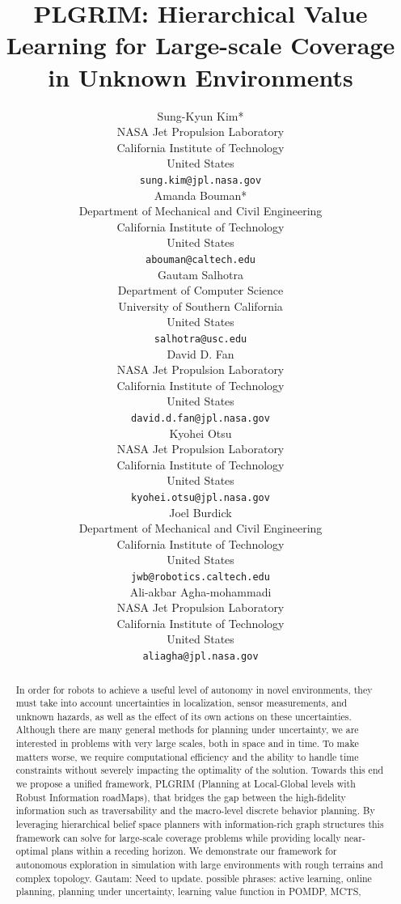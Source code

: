 \documentclass{article}
\title{
PLGRIM: Hierarchical Value Learning for Large-scale Coverage in Unknown Environments
}
\author{
  Sung-Kyun Kim*\\
  NASA Jet Propulsion Laboratory\\
  California Institute of Technology\\
  United States\\
  \texttt{sung.kim@jpl.nasa.gov} \\
  \And
  Amanda Bouman*\\
  Department of Mechanical and Civil Engineering\\
  California Institute of Technology\\
  United States\\
  \texttt{abouman@caltech.edu} \\
  \And
  Gautam Salhotra\\
  Department of Computer Science\\
  University of Southern California\\
  United States\\
  \texttt{salhotra@usc.edu} \\
  \And
  David D. Fan\\
  NASA Jet Propulsion Laboratory\\
  California Institute of Technology\\
  United States\\
  \texttt{david.d.fan@jpl.nasa.gov} \\
  \And
  Kyohei Otsu\\
  NASA Jet Propulsion Laboratory\\
  California Institute of Technology\\
  United States\\
  \texttt{kyohei.otsu@jpl.nasa.gov} \\
  \And
  Joel Burdick\\
  Department of Mechanical and Civil Engineering\\
  California Institute of Technology\\
  United States\\
  \texttt{jwb@robotics.caltech.edu} \\
  \And
  Ali-akbar Agha-mohammadi\\
  NASA Jet Propulsion Laboratory\\
  California Institute of Technology\\
  United States\\
  \texttt{aliagha@jpl.nasa.gov} \\
}
\newcommand{\gautam}[1]{{\color{cyan}Gautam: #1 }}
\begin{document}
\maketitle


\begin{abstract}
In order for robots to achieve a useful level of autonomy in novel environments, they must take into account uncertainties in localization, sensor measurements, and unknown hazards, as well as the effect of its own actions on these uncertainties.  Although there are many general methods for planning under uncertainty, we are interested in problems with very large scales, both in space and in time.  To make matters worse, we require computational efficiency and the ability to handle time constraints without severely impacting the optimality of the solution.
Towards this end we propose a unified framework, PLGRIM (Planning at Local-Global levels with Robust Information roadMaps), that bridges the gap between the high-fidelity information such as traversability and the macro-level discrete behavior planning.
By leveraging hierarchical belief space planners with information-rich graph structures this framework can solve for large-scale coverage problems while providing locally near-optimal plans within a receding horizon.
We demonstrate our framework for autonomous exploration in simulation with large environments with rough terrains and complex topology.
\gautam{Need to update. possible phrases: active learning, online planning, planning under uncertainty, learning value function in POMDP, MCTS, }
\end{abstract}

\end{document}
